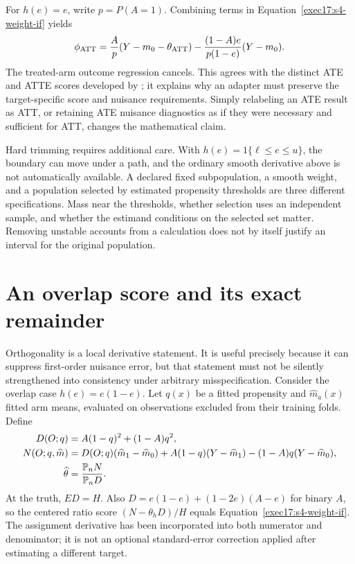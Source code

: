 For $h(e)=e$, write $p=P(A=1)$. Combining terms in
Equation~\eqref{exec17:s4-weight-if} yields
\begin{equation}
 \phi_{\rm ATT}=
 \frac{A}{p}(Y-m_0-\theta_{\rm ATT})
 -\frac{(1-A)e}{p(1-e)}(Y-m_0).
 \label{exec17:s4-att-if}
\end{equation}
The treated-arm outcome regression cancels. This agrees with the distinct
ATE and ATTE scores developed by \citet{dml2018}; it explains why an adapter
must preserve the target-specific score and nuisance requirements. Simply
relabeling an ATE result as ATT, or retaining ATE nuisance diagnostics as if
they were necessary and sufficient for ATT, changes the mathematical claim.

Hard trimming requires additional care. With
$h(e)=1\{\ell\leq e\leq u\}$, the boundary can move under a path, and the
ordinary smooth derivative above is not automatically available. A declared
fixed subpopulation, a smooth weight, and a population selected by estimated
propensity thresholds are three different specifications. Mass near the
thresholds, whether selection uses an independent sample, and whether the
estimand conditions on the selected set matter. Removing unstable accounts
from a calculation does not by itself justify an interval for the original
population.

\section{An overlap score and its exact remainder}
\label{exec17:s4-remainder}

Orthogonality is a local derivative statement. It is useful precisely because
it can suppress first-order nuisance error, but that statement must not be
silently strengthened into consistency under arbitrary misspecification.
Consider the overlap case $h(e)=e(1-e)$. Let $q(x)$ be a fitted propensity and
$\widehat m_a(x)$ fitted arm means, evaluated on observations excluded from
their training folds. Define
\begin{align}
 D(O;q)&=A(1-q)^2+(1-A)q^2,\notag\\
 N(O;q,\widehat m)&=D(O;q)(\widehat m_1-\widehat m_0)
      +A(1-q)(Y-\widehat m_1)
      -(1-A)q(Y-\widehat m_0),\notag\\
 \widehat\theta&=\frac{\mathbb P_nN}{\mathbb P_nD}.
 \label{exec17:s4-overlap-ratio}
\end{align}
At the truth, $E D=H$. Also
$D=e(1-e)+(1-2e)(A-e)$ for binary $A$, so the centered ratio score
$(N-\theta_hD)/H$ equals Equation~\eqref{exec17:s4-weight-if}.
The assignment derivative has been incorporated into both numerator and
denominator; it is not an optional standard-error correction applied after
estimating a different target.

